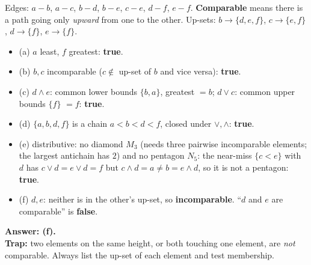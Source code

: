 \documentclass{fkt-notes}
\theoremstyle{definition}
\begin{document}
\begin{example}\leavevmode
  \begin{center}
  \end{center}
  Edges: $a\!-\!b$, $a\!-\!c$, $b\!-\!d$, $b\!-\!e$, $c\!-\!e$, $d\!-\!f$, $e\!-\!f$.
  \textbf{Comparable} means there is a path going only \emph{upward}
  from one to the other. Up-sets: $b\to\{d,e,f\}$, $c\to\{e,f\}$,
  $d\to\{f\}$, $e\to\{f\}$.
  \begin{itemize}[nosep]
    \item (a) $a$ least, $f$ greatest: \textbf{true}.
    \item (b) $b,c$ incomparable ($c\notin$ up-set of $b$ and vice versa): \textbf{true}.
    \item (c) $d\wedge e$: common lower bounds $\{b,a\}$, greatest $=b$; $d\vee c$: common upper bounds $\{f\}$ $=f$: \textbf{true}.
    \item (d) $\{a,b,d,f\}$ is a chain $a<b<d<f$, closed under $\vee,\wedge$: \textbf{true}.
    \item (e) distributive: no diamond $M_3$ (needs three pairwise incomparable elements; the largest antichain has $2$) and no pentagon $N_5$: the near-miss $\{c<e\}$ with $d$ has $c\vee d=e\vee d=f$ but $c\wedge d=a\neq b=e\wedge d$, so it is not a pentagon: \textbf{true}.
    \item (f) $d,e$: neither is in the other's up-set, so \textbf{incomparable}. ``$d$ and $e$ are comparable'' is \textbf{false}.
  \end{itemize}
  \textbf{Answer: (f).}\\
  \textbf{Trap:} two elements on the same height, or both touching one
  element, are \emph{not} comparable. Always list the up-set of each
  element and test membership.
\end{example}
\end{document}
